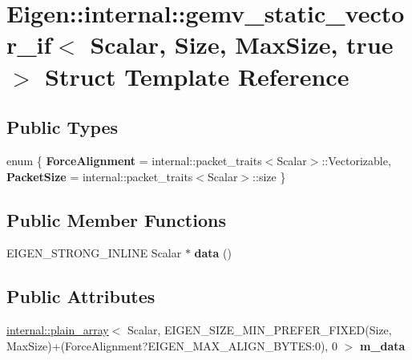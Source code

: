 \hypertarget{struct_eigen_1_1internal_1_1gemv__static__vector__if_3_01_scalar_00_01_size_00_01_max_size_00_01true_01_4}{}\section{Eigen\+::internal\+::gemv\+\_\+static\+\_\+vector\+\_\+if$<$ Scalar, Size, Max\+Size, true $>$ Struct Template Reference}
\label{struct_eigen_1_1internal_1_1gemv__static__vector__if_3_01_scalar_00_01_size_00_01_max_size_00_01true_01_4}
\subsection*{Public Types}
\begin{DoxyCompactItemize}
\item 
\mbox{\label{struct_eigen_1_1internal_1_1gemv__static__vector__if_3_01_scalar_00_01_size_00_01_max_size_00_01true_01_4_a1f9fc6ceaa07d531b1a489df62912575}} 
enum \{ {\bfseries Force\+Alignment} = internal\+::packet\+\_\+traits$<$Scalar$>$\+::Vectorizable, 
{\bfseries Packet\+Size} = internal\+::packet\+\_\+traits$<$Scalar$>$\+::size
 \}
\end{DoxyCompactItemize}
\subsection*{Public Member Functions}
\begin{DoxyCompactItemize}
\item 
\mbox{\label{struct_eigen_1_1internal_1_1gemv__static__vector__if_3_01_scalar_00_01_size_00_01_max_size_00_01true_01_4_a5b112b500e6277a2398e5183ab764f40}} 
E\+I\+G\+E\+N\+\_\+\+S\+T\+R\+O\+N\+G\+\_\+\+I\+N\+L\+I\+NE Scalar $\ast$ {\bfseries data} ()
\end{DoxyCompactItemize}
\subsection*{Public Attributes}
\begin{DoxyCompactItemize}
\item 
\mbox{\label{struct_eigen_1_1internal_1_1gemv__static__vector__if_3_01_scalar_00_01_size_00_01_max_size_00_01true_01_4_a2b9b29bb0e25a591296c6e10ee8a8fd6}} 
\mbox{\hyperlink{struct_eigen_1_1internal_1_1plain__array}{internal\+::plain\+\_\+array}}$<$ Scalar, E\+I\+G\+E\+N\+\_\+\+S\+I\+Z\+E\+\_\+\+M\+I\+N\+\_\+\+P\+R\+E\+F\+E\+R\+\_\+\+F\+I\+X\+ED(Size, Max\+Size)+(Force\+Alignment?E\+I\+G\+E\+N\+\_\+\+M\+A\+X\+\_\+\+A\+L\+I\+G\+N\+\_\+\+B\+Y\+T\+E\+S\+:0), 0 $>$ {\bfseries m\+\_\+data}
\end{DoxyCompactItemize}


